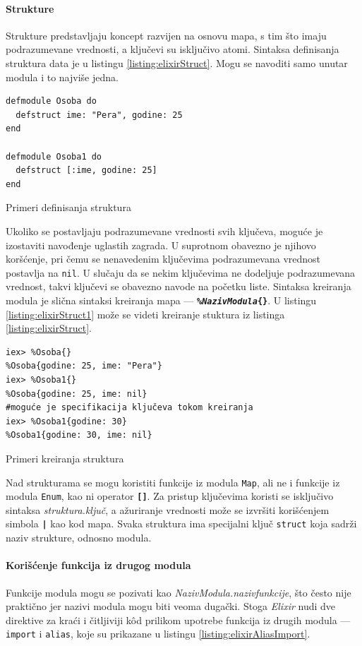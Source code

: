 \documentclass[12pt,oneside]{memoir}
\begin{document}
\paragraph{Strukture}
Strukture predstavljaju koncept razvijen na osnovu mapa, s tim što imaju podrazumevane 
vrednosti, a ključevi su isključivo atomi. Sintaksa definisanja struktura data je u listingu
\ref{listing:elixirStruct}. Mogu se navoditi samo unutar modula i to najviše jedna.
\begin{listing}[!h]
\begin{verbatim}
defmodule Osoba do
  defstruct ime: "Pera", godine: 25
end

defmodule Osoba1 do
  defstruct [:ime, godine: 25]
end
\end{verbatim}
\caption{Primeri definisanja struktura}
\label{listing:elixirStruct}
\end{listing}

Ukoliko se postavljaju podrazumevane vrednosti svih ključeva, moguće je izostaviti navođenje
uglastih zagrada. U suprotnom obavezno je njihovo koršćenje, pri čemu se nenavedenim ključevima
podrazumevana vrednost postavlja na \texttt{nil}. U slučaju da se nekim ključevima ne dodeljuje
podrazumevana vrednost, takvi ključevi se obavezno navode na početku liste. Sintaksa kreiranja
modula je slična sintaksi kreiranja mapa --- \texttt{\textbf{\%\emph{NazivModula}\{\}}}. U 
listingu \ref{listing:elixirStruct1} može se videti kreiranje stuktura iz listinga
\ref{listing:elixirStruct}.
\begin{listing}[!h]
\begin{verbatim}
iex> %Osoba{}
%Osoba{godine: 25, ime: "Pera"}
iex> %Osoba1{}
%Osoba{godine: 25, ime: nil}
#moguće je specifikacija ključeva tokom kreiranja
iex> %Osoba1{godine: 30}
%Osoba1{godine: 30, ime: nil}
\end{verbatim}
\caption{Primeri kreiranja struktura}
\label{listing:elixirStruct1}
\end{listing}

Nad strukturama se mogu koristiti funkcije iz modula \texttt{Map}, ali ne i funkcije iz
modula \texttt{Enum}, kao ni operator \texttt{\textbf{[\smallskip]}}. Za pristup ključevima
koristi se isključivo sintaksa \emph{struktura.ključ}, a ažuriranje vrednosti može se izvršiti
korišćenjem simbola \texttt{\textbf{|}} kao kod mapa. Svaka struktura ima specijalni ključ 
\texttt{\textunderscore\textunderscore{}struct\textunderscore\textunderscore} koja sadrži 
naziv strukture, odnosno modula. 

\paragraph{Korišćenje funkcija iz drugog modula}
Funkcije modula mogu se pozivati kao \emph{NazivModula.naziv\textunderscore{}funkcije},
što često nije praktično jer nazivi modula
mogu biti veoma dugački. Stoga \emph{Elixir} nudi dve direktive za kraći i čitljiviji k\^{o}d prilikom
upotrebe funkcija iz drugih modula --- \texttt{import} i \texttt{alias}, koje su prikazane u
listingu \ref{listing:elixirAliasImport}.
\end{document}
